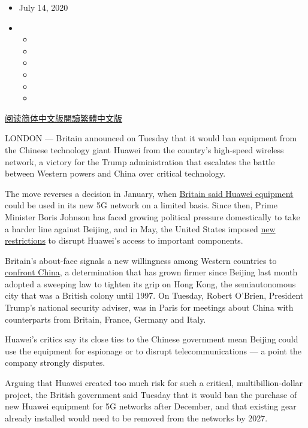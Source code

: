 \begin{itemize}
\item
  July 14, 2020
\item
  \begin{itemize}
  \item
  \item
  \item
  \item
  \item
  \item
  \end{itemize}
\end{itemize}

\href{https://cn.nytimes.com/business/20200715/huawei-uk-5g/}{阅读简体中文版}\href{https://cn.nytimes.com/business/20200715/huawei-uk-5g/zh-hant/}{閱讀繁體中文版}

LONDON --- Britain announced on Tuesday that it would ban equipment from
the Chinese technology giant Huawei from the country's high-speed
wireless network, a victory for the Trump administration that escalates
the battle between Western powers and China over critical technology.

The move reverses a decision in January, when
\href{https://www.nytimes.com/2020/01/28/technology/britain-huawei-5G.html}{Britain
said Huawei equipment} could be used in its new 5G network on a limited
basis. Since then, Prime Minister Boris Johnson has faced growing
political pressure domestically to take a harder line against Beijing,
and in May, the United States imposed
\href{https://www.nytimes.com/2020/05/15/business/economy/commerce-department-huawei.html}{new
restrictions} to disrupt Huawei's access to important components.

Britain's about-face signals a new willingness among Western countries
to
\href{https://www.nytimes.com/2020/06/29/world/asia/china-hong-kong-security-law-rules.html}{confront
China}, a determination that has grown firmer since Beijing last month
adopted a sweeping law to tighten its grip on Hong Kong, the
semiautonomous city that was a British colony until 1997. On Tuesday,
Robert O'Brien, President Trump's national security adviser, was in
Paris for meetings about China with counterparts from Britain, France,
Germany and Italy.

Huawei's critics say its close ties to the Chinese government mean
Beijing could use the equipment for espionage or to disrupt
telecommunications --- a point the company strongly disputes.

Arguing that Huawei created too much risk for such a critical,
multibillion-dollar project, the British government said Tuesday that it
would ban the purchase of new Huawei equipment for 5G networks after
December, and that existing gear already installed would need to be
removed from the networks by 2027.

